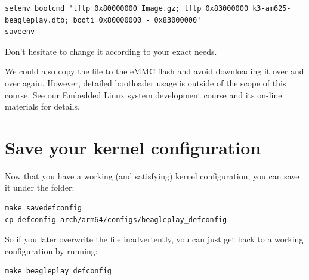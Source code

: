 {\footnotesize
\begin{verbatim}
setenv bootcmd 'tftp 0x80000000 Image.gz; tftp 0x83000000 k3-am625-beagleplay.dtb; booti 0x80000000 - 0x83000000'
saveenv
\end{verbatim}
}

Don't hesitate to change it according to your exact needs.

We could also copy the  file to the eMMC flash and avoid
downloading it over and over again. However, detailed bootloader
usage is outside of the scope of this course. See our
\href{https://bootlin.com/training/embedded-linux/}{Embedded
Linux system development course} and its on-line materials for
details.

\section{Save your kernel configuration}

Now that you have a working (and satisfying) kernel configuration, you
can save it under the  folder:

\begin{verbatim}
make savedefconfig
cp defconfig arch/arm64/configs/beagleplay_defconfig
\end{verbatim}

So if you later overwrite the  file inadvertently, you can
just get back to a working configuration by running:

\begin{verbatim}
make beagleplay_defconfig
\end{verbatim}
